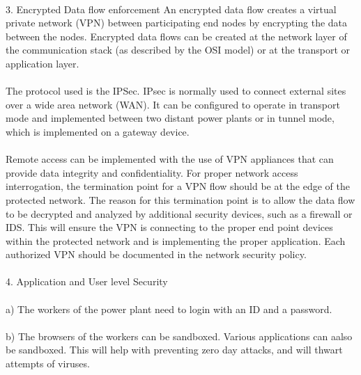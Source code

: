 \documentclass{article}
\begin{document}
\paragraph{}
3. Encrypted Data flow enforcement
An encrypted data flow creates a virtual private network (VPN) between participating end nodes
by encrypting the data between the nodes. 
Encrypted data flows can be created at the network layer of the communication stack (as
described by the OSI model) or at the transport or application layer.\paragraph{}
The protocol used is the IPSec.
 IPsec is normally used to connect external sites over a wide area network (WAN). It can be configured to operate in transport mode and implemented between two distant power plants or in tunnel mode, which is implemented on a gateway device. \paragraph{}
Remote access can be implemented with the use of VPN appliances that can provide data integrity and confidentiality. For proper network access interrogation, the termination point for a VPN flow
should be at the edge of the protected network. The reason for this termination point is
to allow the data flow to be decrypted and analyzed by additional security devices, such as a
firewall or IDS. This will ensure the VPN is connecting to the proper end point devices within
the protected network and is implementing the proper application. Each authorized VPN should
be documented in the network security policy.
\paragraph{}

4.  Application and User level Security\paragraph{}
a) The workers of the power plant need to login with an ID and a password. \paragraph{}
b) The browsers of the workers can be sandboxed. Various applications can aalso be sandboxed. This will help with preventing zero day attacks, and will thwart attempts of viruses.
\end{document}
